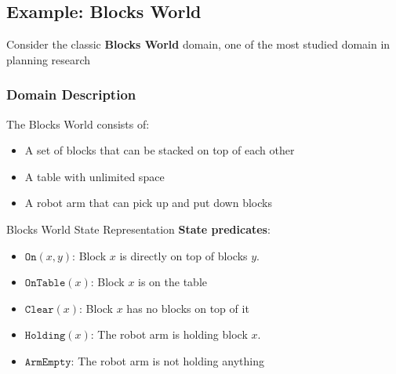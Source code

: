 \documentclass[a4paper]{article}
\theoremstyle{definition}
\begin{document}
\subsection{Example: Blocks World}
Consider the classic \textbf{Blocks World} domain, one of the most studied domain in planning research
\subsubsection{Domain Description}
The Blocks World consists of:
\begin{itemize}
    \item A set of blocks that can be stacked on top of each other 
    \item A table with unlimited space
    \item A robot arm that can pick up and put down blocks
\end{itemize}
\begin{example}{Blocks World State Representation}
\textbf{State predicates}:
\begin{itemize}
    \item \( \texttt{On}(x,y) \): Block \( x \) is directly on top of blocks \( y \).
    \item \( \texttt{OnTable}(x) \): Block \( x \) is on the table 
    \item \( \texttt{Clear}(x) \): Block \( x \) has no blocks on top of it 
    \item \( \texttt{Holding}(x) \): The robot arm is holding block \( x \).
    \item \( \texttt{ArmEmpty} \): The robot arm is not holding anything
\end{itemize}
\end{example}
\end{document}

